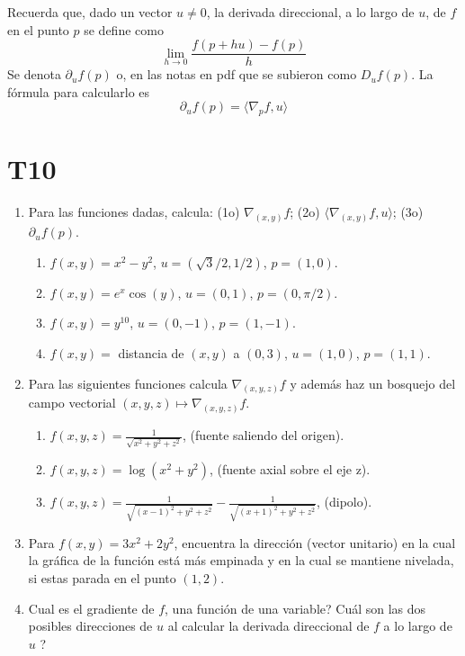 \documentclass{article}
\theoremstyle{definition}
\begin{document}
Recuerda que, dado un vector $u\ne 0$, la derivada direccional, a lo largo de $u$, de $f$
en el punto $p$ se define como
$$
\lim_{h \to 0} \frac{f(p+hu)-f(p)}{h}
$$
Se denota $\partial_uf(p)$ o, en las notas en pdf que
se subieron como  $D_uf(p)$. La f\'ormula para calcularlo es
$$
\partial_uf(p)= \langle \nabla_pf, u \rangle 
$$

\section*{T10 }

\begin{enumerate}
\item Para las funciones dadas, calcula: (1o) $\nabla_{(x,y)}f$;
  (2o) $\langle \nabla_{(x,y)} f, u \rangle$;
  (3o) $\partial_{u}f(p)$.

  \begin{enumerate}
  \item $f(x,y)=x^2-y^2$, $u=(\sqrt{3}/2,1/2)$, $p=(1,0)$.
  \item $f(x,y)=e^x\cos(y)$, $u=(0,1)$, $p=(0,\pi/2)$.
  \item $f(x,y)=y^{10}$, $u=(0,-1)$, $p=(1,-1)$.
    \item $f(x,y)=$ distancia de $(x,y)$ a $(0,3)$, $u=(1,0)$, $p=(1,1)$.
  \end{enumerate}

\item Para las siguientes funciones calcula $\nabla_{(x,y,z)}f$ y adem\'as haz un bosquejo
  del campo vectorial $(x,y,z)\mapsto \nabla_{(x,y,z)}f$.
  \begin{enumerate}
  \item $f(x,y,z)=\frac{1}{\sqrt{x^2+y^2+z^2}}$, (fuente saliendo del origen).
  \item $f(x,y,z)=\log(x^2+y^2)$, (fuente axial sobre el eje z).
  \item $f(x,y,z)=\frac{1}{\sqrt{(x-1)^2+y^2+z^2}}-\frac{1}{\sqrt{(x+1)^2+y^2+z^2}}$, (dipolo). 
  \end{enumerate}

\item Para $f(x,y)=3x^2+2y^2$, encuentra la direcci\'on (vector unitario) en la cual la gr\'afica
  de la funci\'on est\'a m\'as empinada  y en la cual se mantiene nivelada, si estas parada
  en el punto $(1,2)$.
  
\item \textquestiondown Cual es el gradiente de $f$,
  una funci\'on de una variable?
  \textquestiondown Cu\'al son las dos posibles direcciones de $u$ al calcular
  la derivada direccional de $f$ a lo largo de $u$ ?


\end{enumerate}
\end{document}
